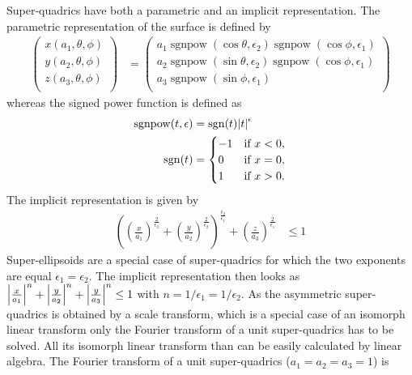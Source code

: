 Super-quadrics have both a
parametric and an implicit representation.
The parametric representation of the surface is defined by
\begin{align}\label{eq:superquadrics:parametric}
  \left(
    \begin{array}{c}
      x(a_1,\theta,\phi) \\
      y(a_2,\theta,\phi) \\
      z(a_3,\theta,\phi) \\
    \end{array}
  \right)
 &=
 \left(
    \begin{array}{c}
     a_1 \operatorname{sgnpow}(\cos\theta,\epsilon_2)\operatorname{sgnpow}(\cos\phi,\epsilon_1)  \\
     a_2 \operatorname{sgnpow}(\sin\theta,\epsilon_2)\operatorname{sgnpow}(\cos\phi,\epsilon_1)  \\
     a_3 \operatorname{sgnpow}(\sin\phi,\epsilon_1) \\
    \end{array}
  \right)
\end{align}
whereas the signed power function is defined as
\begin{align}\label{eq:sgnpow}
  \operatorname{sgnpow}(t,\epsilon) &= \operatorname{sgn}(t)\abs{t}^\epsilon \\
  \operatorname{sgn}(t) &=
  \begin{cases}
    -1&{\text{if }}x<0,\\
     0&{\text{if }}x=0,\\
     1&{\text{if }}x>0.
  \end{cases}
\end{align}
The implicit representation is given by
\begin{align}\label{eq:superquadrics:implicit}
\left(
     \left(\frac{x}{a_1}\right)^{\frac{2}{\epsilon_2}}+
     \left(\frac{y}{a_2}\right)^{\frac{2}{\epsilon_2}}
\right)^{\frac{\epsilon_2}{\epsilon_1}} +
\left(\frac{z}{a_3}\right)^{\frac{2}{\epsilon_1}} &\leq 1
\end{align}
Super-ellipsoids are a special case of super-quadrics for which the two exponents are equal $\epsilon_1=\epsilon_2$. The implicit representation then looks as
$\abs{\frac{x}{a_1}}^n+\abs{\frac{y}{a_2}}^n+\abs{\frac{y}{a_3}}^n\leq 1$ with $n=1/\epsilon_1=1/\epsilon_2$.
As the asymmetric super-quadrics is obtained by a scale transform, which is a special case of an isomorph linear transform only the Fourier transform of a unit super-quadrics has to be solved. All its isomorph linear transform than can be easily calculated by linear algebra.  The Fourier transform of a unit super-quadrics ($a_1=a_2=a_3=1$) is
